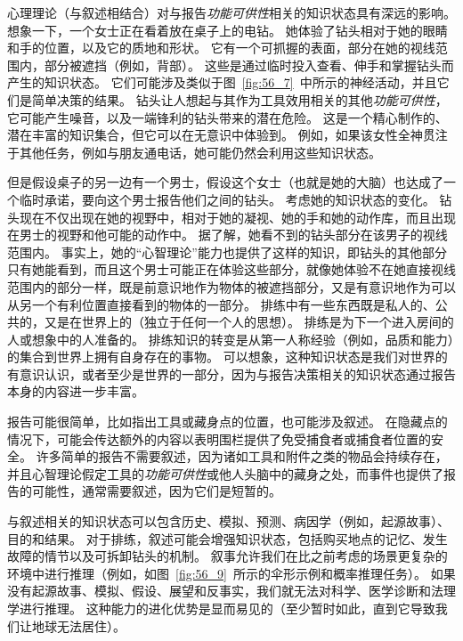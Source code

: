 心理理论（与叙述相结合）对与报告\textit{功能可供性}相关的知识状态具有深远的影响。
想象一下，一个女士正在看着放在桌子上的电钻。
她体验了钻头相对于她的眼睛和手的位置，以及它的质地和形状。
它有一个可抓握的表面，部分在她的视线范围内，部分被遮挡（例如，背部）。
这些是通过临时投入查看、伸手和掌握钻头而产生的知识状态。
它们可能涉及类似于图~\ref{fig:56_7}~中所示的神经活动，并且它们是简单决策的结果。
钻头让人想起与其作为工具效用相关的其他\textit{功能可供性}，它可能产生噪音，以及一端锋利的钻头带来的潜在危险。
这是一个精心制作的、潜在丰富的知识集合，但它可以在无意识中体验到。
例如，如果该女性全神贯注于其他任务，例如与朋友通电话，她可能仍然会利用这些知识状态。


但是假设桌子的另一边有一个男士，假设这个女士（也就是她的大脑）也达成了一个临时承诺，要向这个男士报告他们之间的钻头。
考虑她的知识状态的变化。
钻头现在不仅出现在她的视野中，相对于她的凝视、她的手和她的动作库，而且出现在男士的视野和他可能的动作中。
据了解，她看不到的钻头部分在该男子的视线范围内。
事实上，她的“心智理论”能力也提供了这样的知识，即钻头的其他部分只有她能看到，而且这个男士可能正在体验这些部分，就像她体验不在她直接视线范围内的部分一样，既是前意识地作为物体的被遮挡部分，又是有意识地作为可以从另一个有利位置直接看到的物体的一部分。
排练中有一些东西既是私人的、公共的，又是在世界上的（独立于任何一个人的思想）。
排练是为下一个进入房间的人或想象中的人准备的。
排练知识的转变是从第一人称经验（例如，品质和能力）的集合到世界上拥有自身存在的事物。
可以想象，这种知识状态是我们对世界的有意识认识，或者至少是世界的一部分，因为与报告决策相关的知识状态通过报告本身的内容进一步丰富。


报告可能很简单，比如指出工具或藏身点的位置，也可能涉及叙述。
在隐藏点的情况下，可能会传达额外的内容以表明围栏提供了免受捕食者或捕食者位置的安全。
许多简单的报告不需要叙述，因为诸如工具和附件之类的物品会持续存在，并且心智理论假定工具的\textit{功能可供性}或他人头脑中的藏身之处，而事件也提供了报告的可能性，通常需要叙述，因为它们是短暂的。


与叙述相关的知识状态可以包含历史、模拟、预测、病因学（例如，起源故事）、目的和结果。
对于排练，叙述可能会增强知识状态，包括购买地点的记忆、发生故障的情节以及可拆卸钻头的机制。
叙事允许我们在比之前考虑的场景更复杂的环境中进行推理（例如，如图~\ref{fig:56_9}~所示的伞形示例和概率推理任务）。
如果没有起源故事、模拟、假设、展望和反事实，我们就无法对科学、医学诊断和法理学进行推理。
这种能力的进化优势是显而易见的（至少暂时如此，直到它导致我们让地球无法居住）。


